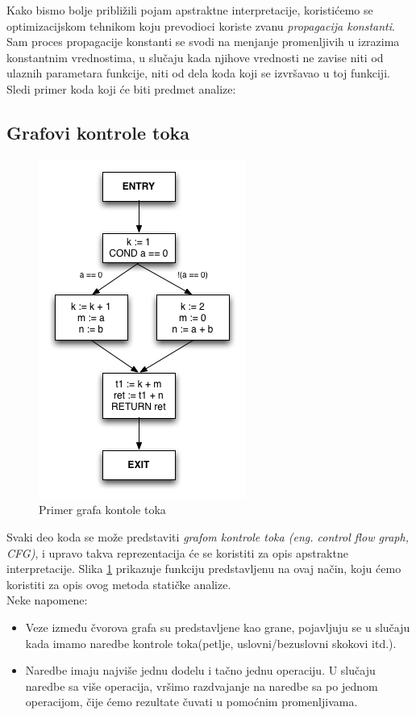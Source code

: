 Kako bismo bolje približili pojam apstraktne interpretacije, koristićemo se
optimizacijskom tehnikom koju prevodioci koriste zvanu \emph{propagacija konstanti}.
Sam proces propagacije konstanti se svodi na menjanje promenljivih u izrazima
konstantnim vrednostima, u slučaju kada njihove vrednosti ne zavise niti od
ulaznih parametara funkcije, niti od dela koda koji se izvršavao u toj funkciji.
Sledi primer koda koji će biti predmet analize:


\subsection{Grafovi kontrole toka}
\label{subsec:cfgs}

\begin{figure}[H]
\begin{center}
\includegraphics[scale=0.5]{Treehydra-cfg.png}
\end{center}
\caption{Primer grafa kontole toka}
\label{fig:graf}
\end{figure}

Svaki deo koda se može predstaviti \emph{grafom kontrole toka (eng. control flow graph, CFG)},
i upravo takva reprezentacija će se koristiti za opis apstraktne interpretacije.
Slika \ref{fig:graf} prikazuje funkciju predstavljenu na ovaj način, koju ćemo koristiti za
opis ovog metoda statičke analize.\\
Neke napomene:
\begin{itemize}
\item Veze između čvorova grafa su predstavljene kao grane, pojavljuju se u slučaju
kada imamo naredbe kontrole toka(petlje, uslovni/bezuslovni skokovi itd.).
\item Naredbe imaju najviše jednu dodelu i tačno jednu operaciju. U slučaju naredbe
sa više operacija, vršimo razdvajanje na naredbe sa po jednom operacijom, čije
ćemo rezultate čuvati u pomoćnim promenljivama.
\end{itemize}

